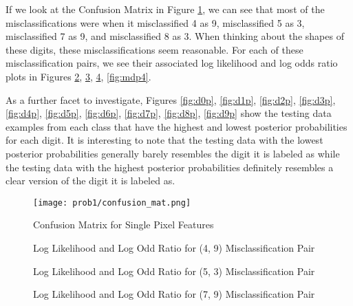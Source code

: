 \documentclass{article}[12pt]
\begin{document}
   If we look at the Confusion Matrix in Figure \ref{fig:cm11}, we can see that most of the misclassifications were when it misclassified 4 as 9, misclassified 5 as 3, misclassified 7 as 9, and misclassified 8 as 3. When thinking about the shapes of these digits, these misclassifications seem reasonable. For each of these misclassification pairs, we see their associated log likelihood and log odds ratio plots in Figures \ref{fig:mdp1}, \ref{fig:mdp2}, \ref{fig:mdp3}, \ref{fig:mdp4}.
   
   As a further facet to investigate, Figures \ref{fig:d0p}, \ref{fig:d1p}, \ref{fig:d2p}, \ref{fig:d3p}, \ref{fig:d4p}, \ref{fig:d5p}, \ref{fig:d6p}, \ref{fig:d7p}, \ref{fig:d8p}, \ref{fig:d9p} show the testing data examples from each class that have the highest and lowest posterior probabilities for each digit. It is interesting to note that the testing data with the lowest posterior probabilities generally barely resembles the digit it is labeled as while the testing data with the highest posterior probabilities definitely resembles a clear version of the digit it is labeled as.
   
   \begin{figure}[!htb]
   	\centering
   	\texttt{[image: prob1/confusion\_mat.png]}
   	\caption{Confusion Matrix for Single Pixel Features}
   	\label{fig:cm11}
   \end{figure}

	\begin{figure}[!htb]
		\centering
		\qquad
		\qquad
		\caption{Log Likelihood and Log Odd Ratio for (4, 9) Misclassification Pair}%
		\label{fig:mdp1}
	\end{figure}

	\begin{figure}[!htb]
		\centering
		\qquad
		\qquad
		\caption{Log Likelihood and Log Odd Ratio for (5, 3) Misclassification Pair}%
		\label{fig:mdp2}
	\end{figure}

	\begin{figure}[!htb]
		\centering
		\qquad
		\qquad
		\caption{Log Likelihood and Log Odd Ratio for (7, 9) Misclassification Pair}%
		\label{fig:mdp3}
	\end{figure}
\end{document}
